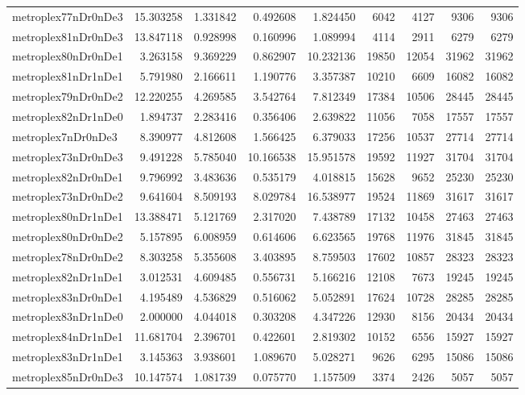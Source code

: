 \begin{longtable}{|l|r|r|r|r|r|r|r|r|}
metroplex77nDr0nDe3 & 15.303258 & 1.331842 & 0.492608 & 1.824450 & 6042 & 4127 & 9306 & 9306 \\
metroplex81nDr0nDe3 & 13.847118 & 0.928998 & 0.160996 & 1.089994 & 4114 & 2911 & 6279 & 6279 \\
metroplex80nDr0nDe1 & 3.263158 & 9.369229 & 0.862907 & 10.232136 & 19850 & 12054 & 31962 & 31962 \\
metroplex81nDr1nDe1 & 5.791980 & 2.166611 & 1.190776 & 3.357387 & 10210 & 6609 & 16082 & 16082 \\
metroplex79nDr0nDe2 & 12.220255 & 4.269585 & 3.542764 & 7.812349 & 17384 & 10506 & 28445 & 28445 \\
metroplex82nDr1nDe0 & 1.894737 & 2.283416 & 0.356406 & 2.639822 & 11056 & 7058 & 17557 & 17557 \\
metroplex7nDr0nDe3 & 8.390977 & 4.812608 & 1.566425 & 6.379033 & 17256 & 10537 & 27714 & 27714 \\
metroplex73nDr0nDe3 & 9.491228 & 5.785040 & 10.166538 & 15.951578 & 19592 & 11927 & 31704 & 31704 \\
metroplex82nDr0nDe1 & 9.796992 & 3.483636 & 0.535179 & 4.018815 & 15628 & 9652 & 25230 & 25230 \\
metroplex73nDr0nDe2 & 9.641604 & 8.509193 & 8.029784 & 16.538977 & 19524 & 11869 & 31617 & 31617 \\
metroplex80nDr1nDe1 & 13.388471 & 5.121769 & 2.317020 & 7.438789 & 17132 & 10458 & 27463 & 27463 \\
metroplex80nDr0nDe2 & 5.157895 & 6.008959 & 0.614606 & 6.623565 & 19768 & 11976 & 31845 & 31845 \\
metroplex78nDr0nDe2 & 8.303258 & 5.355608 & 3.403895 & 8.759503 & 17602 & 10857 & 28323 & 28323 \\
metroplex82nDr1nDe1 & 3.012531 & 4.609485 & 0.556731 & 5.166216 & 12108 & 7673 & 19245 & 19245 \\
metroplex83nDr0nDe1 & 4.195489 & 4.536829 & 0.516062 & 5.052891 & 17624 & 10728 & 28285 & 28285 \\
metroplex83nDr1nDe0 & 2.000000 & 4.044018 & 0.303208 & 4.347226 & 12930 & 8156 & 20434 & 20434 \\
metroplex84nDr1nDe1 & 11.681704 & 2.396701 & 0.422601 & 2.819302 & 10152 & 6556 & 15927 & 15927 \\
metroplex83nDr1nDe1 & 3.145363 & 3.938601 & 1.089670 & 5.028271 & 9626 & 6295 & 15086 & 15086 \\
metroplex85nDr0nDe3 & 10.147574 & 1.081739 & 0.075770 & 1.157509 & 3374 & 2426 & 5057 & 5057 \\

\end{longtable}
